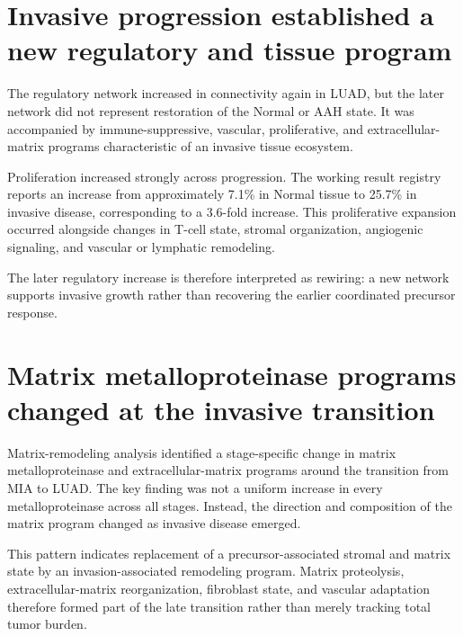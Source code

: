 
\section{Invasive progression established a new regulatory and tissue program}

The regulatory network increased in connectivity again in LUAD, but the later network did not represent restoration of the Normal or AAH state. It was accompanied by immune-suppressive, vascular, proliferative, and extracellular-matrix programs characteristic of an invasive tissue ecosystem.

Proliferation increased strongly across progression. The working result registry reports an increase from approximately 7.1\% in Normal tissue to 25.7\% in invasive disease, corresponding to a 3.6-fold increase. This proliferative expansion occurred alongside changes in T-cell state, stromal organization, angiogenic signaling, and vascular or lymphatic remodeling.

The later regulatory increase is therefore interpreted as rewiring: a new network supports invasive growth rather than recovering the earlier coordinated precursor response.


\section{Matrix metalloproteinase programs changed at the invasive transition}

Matrix-remodeling analysis identified a stage-specific change in matrix metalloproteinase and extracellular-matrix programs around the transition from MIA to LUAD. The key finding was not a uniform increase in every metalloproteinase across all stages. Instead, the direction and composition of the matrix program changed as invasive disease emerged.

This pattern indicates replacement of a precursor-associated stromal and matrix state by an invasion-associated remodeling program. Matrix proteolysis, extracellular-matrix reorganization, fibroblast state, and vascular adaptation therefore formed part of the late transition rather than merely tracking total tumor burden.

